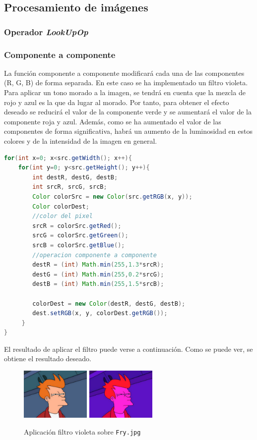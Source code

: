 \subsection{Procesamiento de imágenes}
\subsubsection{Operador \textit{LookUpOp}}

\subsubsection{Componente a componente}
La función componente a componente modificará cada una de las componentes (R, G, B) de forma separada.\vskip0.3cm
En este caso se ha implementado un filtro violeta. Para aplicar un tono morado a la imagen, se tendrá en cuenta que la mezcla de rojo y azul es la que da lugar al morado. Por tanto, para obtener el efecto deseado se reducirá el valor de la componente verde y se aumentará el valor de la componente roja y azul.
\vskip0.3cm
Además, como se ha aumentado el valor de las componentes de forma significativa, habrá un aumento de la luminosidad en estos colores y de la intensidad de la imagen en general.
\begin{lstlisting}[language=Java, caption=Operación componente a componente, label=lst:graddesc]
for(int x=0; x<src.getWidth(); x++){
    for(int y=0; y<src.getHeight(); y++){
        int destR, destG, destB;
        int srcR, srcG, srcB;
        Color colorSrc = new Color(src.getRGB(x, y));
        Color colorDest;
        //color del pixel
        srcR = colorSrc.getRed();
        srcG = colorSrc.getGreen();
        srcB = colorSrc.getBlue();
        //operacion componente a componente
        destR = (int) Math.min(255,1.3*srcR);
        destG = (int) Math.min(255,0.2*srcG);
        destB = (int) Math.min(255,1.5*srcB);
                
        colorDest = new Color(destR, destG, destB);
        dest.setRGB(x, y, colorDest.getRGB());
     }
}
\end{lstlisting}
El resultado de aplicar el filtro puede verse a continuación. Como se puede ver, se obtiene el resultado deseado.
\vskip0.3cm
\begin{figure}[H]
 \centering
  \includegraphics[width=0.3\textwidth]{imagenes/Fry.jpg}
  \includegraphics[width=0.3\textwidth]{imagenes/fryVioleta.jpg}
 \caption{Aplicación filtro violeta sobre \texttt{Fry.jpg}}
 \label{diseño}
 \end{figure}

